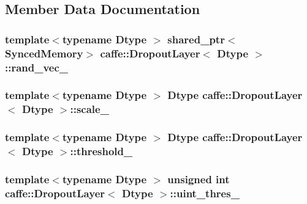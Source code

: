 \subsection{Member Data Documentation}
\hypertarget{classcaffe_1_1_dropout_layer_a3707987fa20305fc798cb5f32a30f669}{
\subsubsection[{rand\+\_\+vec\+\_\+}]{\setlength{\rightskip}{0pt plus 5cm}template$<$typename Dtype $>$ shared\+\_\+ptr$<${\bf Synced\+Memory}$>$ {\bf caffe\+::\+Dropout\+Layer}$<$ Dtype $>$\+::rand\+\_\+vec\+\_\+\hspace{0.3cm}{\ttfamily [protected]}}}\label{classcaffe_1_1_dropout_layer_a3707987fa20305fc798cb5f32a30f669}
\hypertarget{classcaffe_1_1_dropout_layer_ac8702c053de0fea389f5a0ded8cdc544}{
\subsubsection[{scale\+\_\+}]{\setlength{\rightskip}{0pt plus 5cm}template$<$typename Dtype $>$ Dtype {\bf caffe\+::\+Dropout\+Layer}$<$ Dtype $>$\+::scale\+\_\+\hspace{0.3cm}{\ttfamily [protected]}}}\label{classcaffe_1_1_dropout_layer_ac8702c053de0fea389f5a0ded8cdc544}
\hypertarget{classcaffe_1_1_dropout_layer_a8e9d88e6128a97101c27ce8a11158ca6}{
\subsubsection[{threshold\+\_\+}]{\setlength{\rightskip}{0pt plus 5cm}template$<$typename Dtype $>$ Dtype {\bf caffe\+::\+Dropout\+Layer}$<$ Dtype $>$\+::threshold\+\_\+\hspace{0.3cm}{\ttfamily [protected]}}}\label{classcaffe_1_1_dropout_layer_a8e9d88e6128a97101c27ce8a11158ca6}
\hypertarget{classcaffe_1_1_dropout_layer_ae8ba2b98a7bc12643eec8ad72a66be21}{
\subsubsection[{uint\+\_\+thres\+\_\+}]{\setlength{\rightskip}{0pt plus 5cm}template$<$typename Dtype $>$ unsigned int {\bf caffe\+::\+Dropout\+Layer}$<$ Dtype $>$\+::uint\+\_\+thres\+\_\+\hspace{0.3cm}{\ttfamily [protected]}}}\label{classcaffe_1_1_dropout_layer_ae8ba2b98a7bc12643eec8ad72a66be21}



